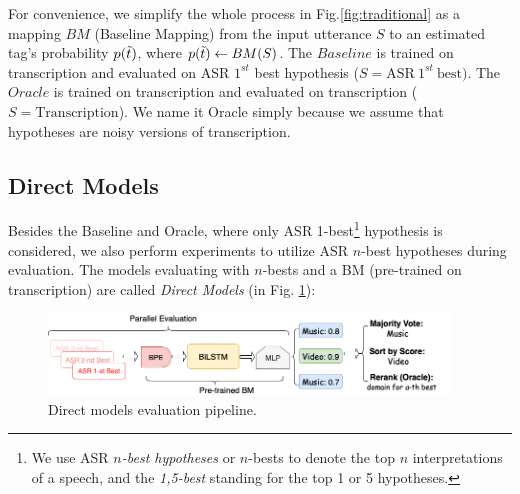 For convenience, we simplify the whole process in Fig.\ref{fig:traditional} as a mapping $BM$ (Baseline Mapping) from the input utterance $S$ to an estimated tag's probability $p(\Tilde{t})$, where $p(\Tilde{t}) \leftarrow BM(S)$.
The $Baseline$ is trained on transcription and evaluated on ASR $1^{st}$ best hypothesis ($S=\text{ASR}\ 1^{st}\  \text{best})$. The $Oracle$ is trained on transcription and evaluated on transcription ($S = \text{Transcription}$). We name it Oracle simply because we assume that hypotheses are noisy versions of transcription. 
\subsection{Direct Models}
\label{subspeech:combination}

Besides the Baseline and Oracle, where only ASR 1-best\footnote{We use ASR \textit{$n$-best hypotheses} or $n$-bests to denote the top $n$ interpretations of a speech, and the \textit{1,5-best} standing for the top 1 or 5 hypotheses.} 
hypothesis is considered, we also perform experiments to utilize ASR $n$-best hypotheses during evaluation. The models evaluating with $n$-bests and a BM (pre-trained on transcription) are called \textit{Direct Models} (in Fig. \ref{fig:eval}):

\begin{figure}[!htp]
	\vspace{2em}
	\centering
	\includegraphics[width=0.95\textwidth]{Graph/speech/Evaluate.png}
	\caption{Direct models evaluation pipeline.}
	\label{fig:eval}
	
\end{figure}

